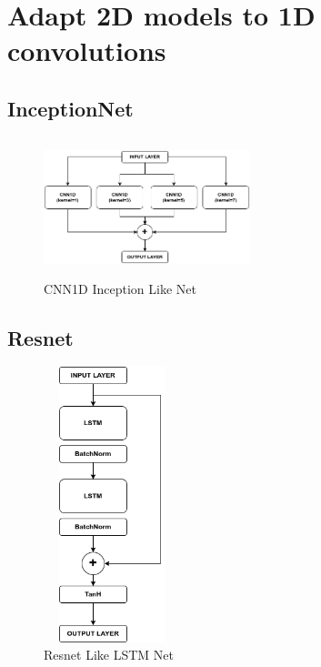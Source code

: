\documentclass[11pt]{article}
\begin{document}
\section{Adapt 2D models to 1D convolutions}
\subsection{InceptionNet}
\begin{center}
\begin{figure}[h]
\includegraphics[width=6cm, height=4cm]{Inception}
\caption{CNN1D Inception Like Net}
\end{figure}
\end{center}

\subsection{Resnet}
\begin{figure}[h]
\includegraphics[width=4cm, height=8cm,angle =90]{resnet}
\caption{Resnet Like LSTM Net}
\end{figure}




\end{document}
